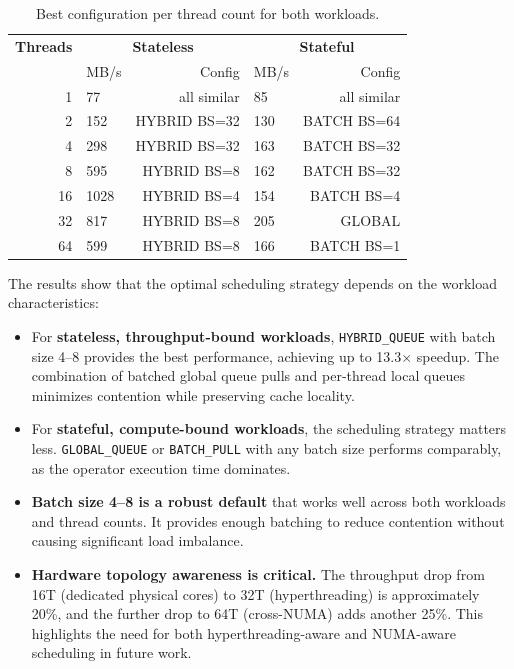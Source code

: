 \begin{table}[h]
\centering
\caption{Best configuration per thread count for both workloads.}
\label{tab:best-configs}
\begin{tabular}{r|lr|lr}
\hline
\textbf{Threads} & \multicolumn{2}{c|}{\textbf{Stateless}} & \multicolumn{2}{c}{\textbf{Stateful}} \\
 & MB/s & Config & MB/s & Config \\
\hline
1  & 77   & all similar       & 85   & all similar \\
2  & 152  & HYBRID BS=32      & 130  & BATCH BS=64 \\
4  & 298  & HYBRID BS=32      & 163  & BATCH BS=32 \\
8  & 595  & HYBRID BS=8       & 162  & BATCH BS=32 \\
16 & 1028 & HYBRID BS=4       & 154  & BATCH BS=4 \\
32 & 817  & HYBRID BS=8       & 205  & GLOBAL \\
64 & 599  & HYBRID BS=8       & 166  & BATCH BS=1 \\
\hline
\end{tabular}
\end{table}

The results show that the optimal scheduling strategy depends on the workload characteristics:

\begin{itemize}
    \item For \textbf{stateless, throughput-bound workloads}, \texttt{HYBRID\_QUEUE} with batch size 4--8 provides the best performance, achieving up to 13.3$\times$ speedup.
    The combination of batched global queue pulls and per-thread local queues minimizes contention while preserving cache locality.

    \item For \textbf{stateful, compute-bound workloads}, the scheduling strategy matters less.
    \texttt{GLOBAL\_QUEUE} or \texttt{BATCH\_PULL} with any batch size performs comparably, as the operator execution time dominates.

    \item \textbf{Batch size 4--8 is a robust default} that works well across both workloads and thread counts.
    It provides enough batching to reduce contention without causing significant load imbalance.

    \item \textbf{Hardware topology awareness is critical.}
    The throughput drop from 16T (dedicated physical cores) to 32T (hyperthreading) is approximately 20\%, and the further drop to 64T (cross-NUMA) adds another 25\%.
    This highlights the need for both hyperthreading-aware and NUMA-aware scheduling in future work.
\end{itemize}
